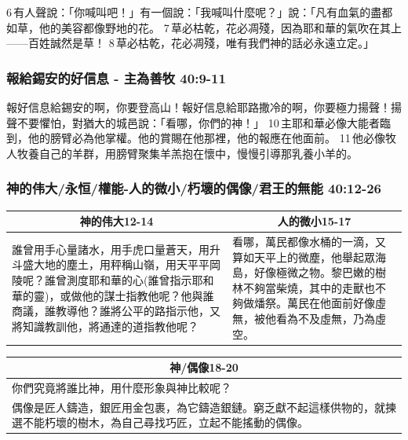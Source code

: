 6 有人聲說：「你喊叫吧！」有一個說：「我喊叫什麼呢？」說：「凡有血氣的盡都如草，他的美容都像野地的花。 7 草必枯乾，花必凋殘，因為耶和華的氣吹在其上——百姓誠然是草！ 8 草必枯乾，花必凋殘，唯有我們神的話必永遠立定。」

\subsubsection{報給錫安的好信息 - 主為善牧 40:9-11}
報好信息給錫安的啊，你要登高山！報好信息給耶路撒冷的啊，你要極力揚聲！揚聲不要懼怕，對猶大的城邑說：「看哪，你們的神！」 10 主耶和華必像大能者臨到，他的膀臂必為他掌權。他的賞賜在他那裡，他的報應在他面前。 11 他必像牧人牧養自己的羊群，用膀臂聚集羊羔抱在懷中，慢慢引導那乳養小羊的。

\subsubsection{神的伟大/永恒/權能-人的微小/朽壞的偶像/君王的無能 40:12-26}

\begin{table}[H]
\vspace{-6mm}
\begin{tabular}{p{6cm}|p{4.75cm}}\hline\hline
\multicolumn{1}{c|}{神的伟大12-14}&\multicolumn{1}{c}{人的微小15-17}\\\hline\hline
誰曾用手心量諸水，用手虎口量蒼天，用升斗盛大地的塵土，用秤稱山嶺，用天平平岡陵呢？誰曾測度耶和華的心(誰曾指示耶和華的靈)，或做他的謀士指教他呢？他與誰商議，誰教導他？誰將公平的路指示他，又將知識教訓他，將通達的道指教他呢？
&看哪，萬民都像水桶的一滴，又算如天平上的微塵，他舉起眾海島，好像極微之物。黎巴嫩的樹林不夠當柴燒，其中的走獸也不夠做燔祭。萬民在他面前好像虛無，被他看為不及虛無，乃為虛空。\\\hline
\end{tabular}
\quad
\begin{tabular}{p{5cm}}\hline\hline
\multicolumn{1}{c}{神/偶像18-20}\\\hline\hline%
你們究竟將誰比神，用什麼形象與神比較呢？\\\hline
偶像是匠人鑄造，銀匠用金包裹，為它鑄造銀鏈。窮乏獻不起這樣供物的，就揀選不能朽壞的樹木，為自己尋找巧匠，立起不能搖動的偶像。\\\hline
\end{tabular}
\end{table}

